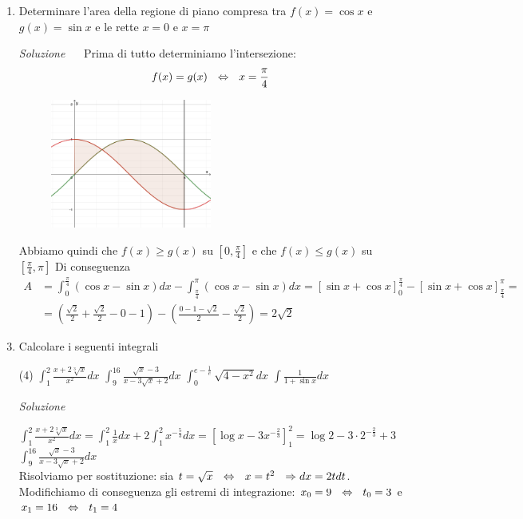 \documentclass{article}
\begin{document}
\begin{enumerate}[label=\textbf{Esercizio 11.\arabic*.},itemindent=*]
\item Determinare l'area della regione di piano compresa tra $f(x)=\cos x$ e $g(x)=\sin x$ e le rette $x=0$ e $x=\pi$
\item[\textit{\large Soluzione~}]~
Prima di tutto determiniamo l'intersezione:
\[f(x)=g(x)~~\Leftrightarrow~~x=\frac{\pi}{4}\]
\begin{figure}[h]
    \centering
    \includegraphics[width=0.5\textwidth]{src/es2.png}
    \caption{}
    \label{fig:es2}
\end{figure}
Abbiamo quindi che $f(x)\geq g(x)$ su $\left[ 0,\frac{\pi}{4} \right]$ e che $f(x)\leq g(x)$ su $\left[ \frac{\pi}{4} , \pi\right]$
Di conseguenza 
\[\begin{aligned}A&=\int _0^{\frac{\pi}{4}}(\cos x-\sin x)dx-\int_{\frac{\pi}{4}}^\pi(\cos x -\sin x)dx=[\sin x+\cos x]_0^{\frac{\pi}{4}}-[\sin x+\cos x]_{\frac{\pi}{4}}^\pi=\\ &=\left(\frac{\sqrt{2}}{2}+\frac{\sqrt{2}}{2}-0-1\right)-\left(\frac{0-1-\sqrt{2}}{2}-\frac{\sqrt{2}}{2}\right)=2\sqrt{2}\end{aligned}\]
\item Calcolare i seguenti integrali
\begin{tasks}(4)
    \task \(\int_{1}^{2}\frac{x+2\sqrt[3]{x}}{x^2}dx\)
    \task \(\int_{9}^{16}\frac{\sqrt{x}-3}{x-3\sqrt{x}+2}dx\)
    \task \(\int_{0}^{e-\frac{1}{e}}\sqrt{4-x^2}dx\)
    \task \(\int\frac{1}{1+\sin x}dx\)
\end{tasks}
\item[\textit{\large Soluzione~}]~
\begin{tasks}
    \task \(\int_{1}^{2}\frac{x+2\sqrt[3]{x}}{x^2}dx=\int_1^2\frac{1}{x}dx+2\int_1^2x^{-\frac{5}{3}}dx=\left[\log x-3x^{-\frac{2}{3}}\right]_1^2=\log2-3\cdot 2^{-\frac{2}{3}}+3\)
    \task \(\int_{9}^{16}\frac{\sqrt{x}-3}{x-3\sqrt{x}+2}dx\)\\
    Risolviamo per sostituzione: sia $t=\sqrt{x}~~\Leftrightarrow~~x=t^2~~\Rightarrow dx=2tdt$. Modifichiamo di conseguenza gli estremi di integrazione: $x_0 =9~~\Leftrightarrow~~t_0=3$ e $x_1 =16~~\Leftrightarrow ~~t_1=4$

\end{tasks}
\end{enumerate}
\end{document}
